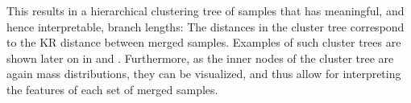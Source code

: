 This results in a hierarchical clustering tree of samples that has meaningful, and hence interpretable, branch lengths:
The distances in the cluster tree correspond to the KR distance between merged samples.
Examples of such cluster trees are shown later on in  and .
Furthermore, as the inner nodes of the cluster tree are again mass distributions,
they can be visualized, and thus allow for interpreting the features of each set of merged samples.

